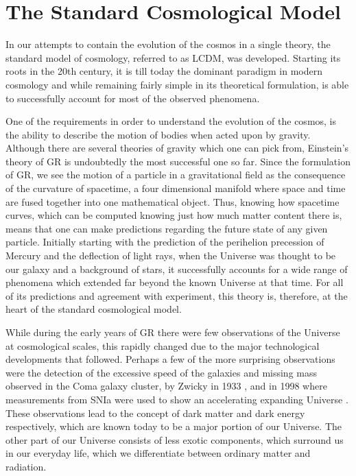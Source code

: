 \section{The Standard Cosmological Model}
\label{sec:the-standard-cosmological-model}


In our attempts to contain the evolution of the cosmos in a single theory, the standard model of cosmology, referred to as \gls{LCDM}, was developed. Starting its roots in the 20th century, it is till today the dominant paradigm in modern cosmology and while remaining fairly simple in its theoretical formulation, is able to successfully account for most of the observed phenomena.

One of the requirements in order to understand the evolution of the cosmos, is the ability to describe the motion of bodies when acted upon by gravity. Although there are several theories of gravity which one can pick from, Einstein's theory of \gls{GR} is undoubtedly the most successful one so far. Since the formulation of \gls{GR}, we see the motion of a particle in a gravitational field as the consequence of the curvature of spacetime, a four dimensional manifold where space and time are fused together into one mathematical object. Thus, knowing how spacetime curves, which can be computed knowing just how much matter content there is, means that one can make predictions regarding the future state of any given particle. Initially starting with the prediction of the perihelion precession of Mercury and the deflection of light rays, when the Universe was thought to be our galaxy and a background of stars, it successfully accounts for a wide range of phenomena which extended far beyond the known Universe at that time. For all of its predictions and agreement with experiment, this theory is, therefore, at the heart of the standard cosmological model.

While during the early years of \gls{GR} there were few observations of the Universe at cosmological scales, this rapidly changed due to the major technological developments that followed. Perhaps a few of the more surprising observations were the detection of the excessive speed of the galaxies and missing mass observed in the Coma galaxy cluster, by Zwicky in 1933 \cite{Zwicky1933}, and in 1998 where measurements from \gls{SNIa} were used to show an accelerating expanding Universe \cite{SupernovaCosmologyProject1998}. These observations lead to the concept of dark matter and dark energy respectively, which are known today to be a major portion of our Universe. The other part of our Universe consists of less exotic components, which surround us in our everyday life, which we differentiate between ordinary matter and radiation.

